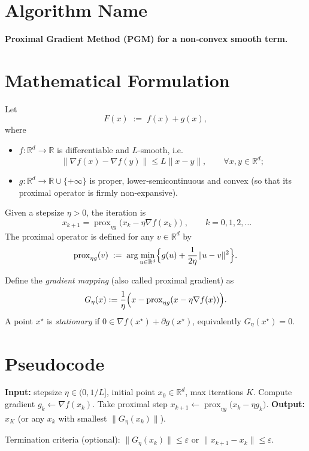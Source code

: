\documentclass[11pt]{article}
\begin{document}
\section*{Algorithm Name}
\textbf{Proximal Gradient Method (PGM) for a non‑convex smooth term.}

\section*{Mathematical Formulation}
Let  
\[
F(x)\;:=\;f(x)+g(x),
\]
where  

\begin{itemize}
\item $f:\mathbb{R}^{d}\rightarrow\mathbb{R}$ is differentiable and $L$‑smooth, i.e.  
\[
\|\nabla f(x)-\nabla f(y)\|\le L\|x-y\|,\qquad\forall x,y\in\mathbb{R}^{d};
\]
\item $g:\mathbb{R}^{d}\rightarrow\mathbb{R}\cup\{+\infty\}$ is proper, lower‑semicontinuous and convex (so that its proximal operator is firmly non‑expansive).
\end{itemize}

Given a stepsize $\eta>0$, the iteration is
\begin{equation}
\boxed{\;x_{k+1}= \operatorname{prox}_{\eta g}\!\bigl(x_{k}-\eta \nabla f(x_{k})\bigr)\;},\qquad k=0,1,2,\dots
\label{eq:update}
\end{equation}
The proximal operator is defined for any $v\in\mathbb{R}^{d}$ by
\[
\operatorname{prox}_{\eta g}(v)\;:=\;\arg\min_{u\in\mathbb{R}^{d}}\Bigl\{g(u)+\frac{1}{2\eta}\|u-v\|^{2}\Bigr\}.
\]

Define the \emph{gradient mapping} (also called proximal gradient) as
\[
G_{\eta}(x):=\frac{1}{\eta}\Bigl(x-\operatorname{prox}_{\eta g}(x-\eta\nabla f(x))\Bigr).
\]
A point $x^{\star}$ is \emph{stationary} if $0\in\nabla f(x^{\star})+\partial g(x^{\star})$, equivalently $G_{\eta}(x^{\star})=0$.

\section*{Pseudocode}
\begin{algorithm}[H]
\caption{Proximal Gradient Method}
\begin{algorithmic}[1]
\STATE \textbf{Input:} stepsize $\eta\in(0,1/L]$, initial point $x_{0}\in\mathbb{R}^{d}$, max iterations $K$.
\STATE Compute gradient $g_{k}\gets\nabla f(x_{k})$.
\STATE Take proximal step $x_{k+1}\gets \operatorname{prox}_{\eta g}\bigl(x_{k}-\eta g_{k}\bigr)$.
\ENDFOR
\STATE \textbf{Output:} $x_{K}$ (or any $x_{k}$ with smallest $\|G_{\eta}(x_{k})\|$).
\end{algorithmic}
\end{algorithm}
Termination criteria (optional): $\|G_{\eta}(x_{k})\|\le\varepsilon$ or $\|x_{k+1}-x_{k}\|\le\varepsilon$.
\end{document}
